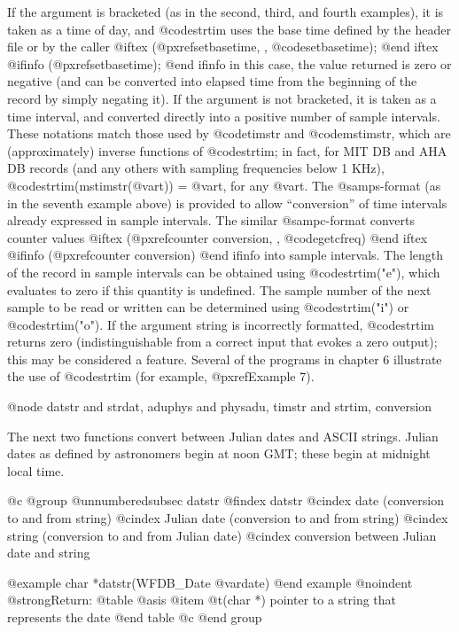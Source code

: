 {{{{{{{{{If the argument is bracketed (as in the second, third, and fourth examples), it
is taken as a time of day, and @code{strtim} uses the base time defined
by the header file or by the caller
@iftex
(@pxref{setbasetime, , @code{setbasetime}});
@end iftex
@ifinfo
(@pxref{setbasetime});
@end ifinfo
in this case, the value returned is zero or negative (and can be
converted into elapsed time from the beginning of the record by simply
negating it).  If the argument is not bracketed, it is taken as a time
interval, and converted directly into a positive number of sample
intervals.  These notations match those used by @code{timstr} and
@code{mstimstr}, which are (approximately) inverse functions of
@code{strtim}; in fact, for MIT DB and AHA DB records (and any others
with sampling frequencies below 1 KHz), @code{strtim(mstimstr(@var{t}))}
= @var{t}, for any @var{t}.  The @samp{s}-format (as in the seventh
example above) is provided to allow ``conversion'' of time intervals
already expressed in sample intervals.  The similar @samp{c}-format
converts counter values
@iftex
(@pxref{counter conversion, , @code{getcfreq}})
@end iftex
@ifinfo
(@pxref{counter conversion})
@end ifinfo
into sample intervals.  The length of the record in
sample intervals can be obtained using @code{strtim("e")}, which
evaluates to zero if this quantity is undefined.  The sample number of
the next sample to be read or written can be determined using
@code{strtim("i")} or @code{strtim("o")}.  If the argument string is
incorrectly formatted, @code{strtim} returns zero (indistinguishable
from a correct input that evokes a zero output); this may be considered
a feature.  Several of the programs in chapter 6 illustrate the use of
@code{strtim} (for example, @pxref{Example 7}).

@node datstr and strdat, aduphys and physadu, timstr and strtim, conversion

The next two functions convert between Julian dates and ASCII strings.
Julian dates as defined by astronomers begin at noon GMT; these begin at
midnight local time.

@c @group
@unnumberedsubsec datstr
@findex datstr
@cindex date (conversion to and from string)
@cindex Julian date (conversion to and from string)
@cindex string (conversion to and from Julian date)
@cindex conversion between Julian date and string

@example
char *datstr(WFDB_Date @var{date})
@end example
@noindent
@strong{Return:}
@table @asis
@item @t{(char *)}
pointer to a string that represents the date
@end table
@c @end group

}}}}}}}}}
